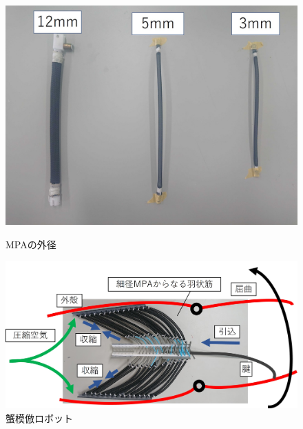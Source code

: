 \documentclass{jarticle}
\begin{document}
\begin{figure}[H]
  \begin{minipage}[b]{0.47\columnwidth}
    \centering
    \includegraphics[scale=0.13]{mpa.JPG}
    \vspace{-4mm}
    \caption{MPAの外径}
    \label{fig:MPA}
  \end{minipage}
  \hspace{0.04\columnwidth}
  \begin{minipage}[b]{0.47\columnwidth}
    \centering
    \includegraphics[scale=0.18]{mosiki.JPG}
    \vspace{-2mm}
    \caption{蟹模倣ロボット\cite{crabrobot2}}
    \label{fig:crabrobot}
  \end{minipage}
\end{figure}
\end{document}

